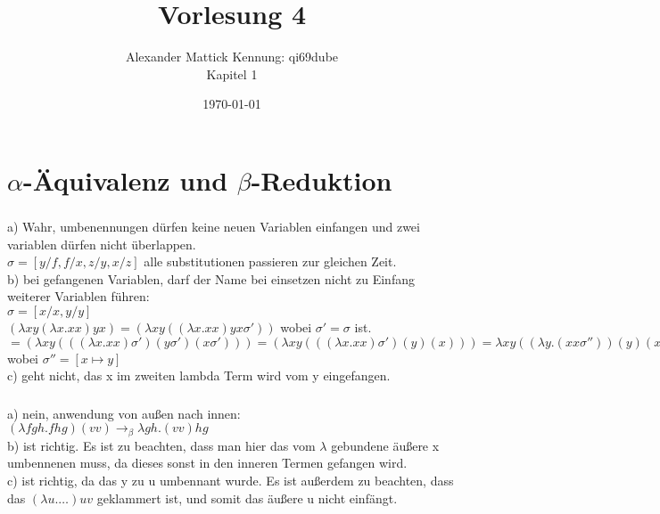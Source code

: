 \documentclass{article}
\author{
Alexander Mattick Kennung: qi69dube\\
Kapitel 1
}
\date{\today}
\title{Vorlesung 4}
\begin{document}
	\maketitle
	\section{$\alpha$-Äquivalenz und $\beta$-Reduktion}
	\subsubsection{}
	a) Wahr, umbenennungen dürfen keine neuen Variablen einfangen und zwei variablen dürfen nicht überlappen.\\
	$\sigma = [y/f, f/x, z/y,x/z]$ alle substitutionen passieren zur gleichen Zeit.\\
	b) bei gefangenen Variablen, darf der Name bei einsetzen nicht zu Einfang weiterer Variablen führen:\\
	$\sigma = [x/x,y/y]$\\
	$(\lambda xy(\lambda x.xx)yx ) = (\lambda xy((\lambda x.xx)yx\sigma') )$ wobei $\sigma'=\sigma$ ist.\\
	$=(\lambda xy(((\lambda x.xx)\sigma')(y\sigma')(x\sigma'))) = (\lambda xy(((\lambda x.xx)\sigma')(y)(x))) = \lambda xy((\lambda y.(xx\sigma''))(y)(x)) = \lambda xy((\lambda y.((x\sigma'')(x\sigma''))(y)(x)) = \lambda xy((\lambda y.yy)(y)(x))$ wobei $\sigma'' = [x\mapsto y]$\\
	c) geht nicht, das x im zweiten lambda Term wird vom y eingefangen.\\
	\subsubsection{}
	a) nein, anwendung von außen nach innen:\\
	$(\lambda fgh.fhg)(vv)\to_\beta \lambda gh.(vv)hg$\\
	b) ist richtig. Es ist zu beachten, dass man hier das vom $\lambda$ gebundene äußere x umbennenen muss, da dieses sonst in den inneren Termen gefangen wird.\\
	c) ist richtig, da das y zu u umbennant wurde. Es ist außerdem zu beachten, dass das $(\lambda u.\dots)uv$ geklammert ist, und somit das äußere u nicht einfängt.\\
\end{document}
